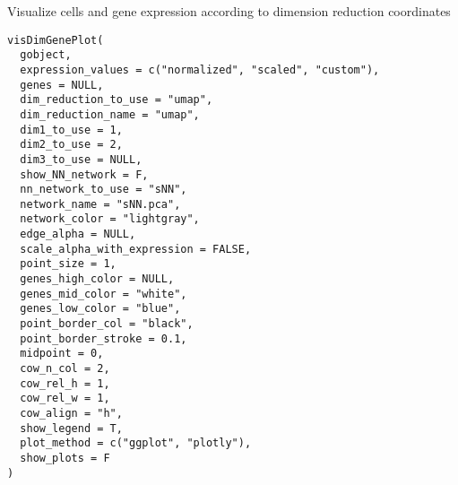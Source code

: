 \documentclass[a4paper]{book}
\begin{document}
%
\begin{Description}\relax
Visualize cells and gene expression according to dimension reduction coordinates
\end{Description}
%
\begin{Usage}
\begin{verbatim}
visDimGenePlot(
  gobject,
  expression_values = c("normalized", "scaled", "custom"),
  genes = NULL,
  dim_reduction_to_use = "umap",
  dim_reduction_name = "umap",
  dim1_to_use = 1,
  dim2_to_use = 2,
  dim3_to_use = NULL,
  show_NN_network = F,
  nn_network_to_use = "sNN",
  network_name = "sNN.pca",
  network_color = "lightgray",
  edge_alpha = NULL,
  scale_alpha_with_expression = FALSE,
  point_size = 1,
  genes_high_color = NULL,
  genes_mid_color = "white",
  genes_low_color = "blue",
  point_border_col = "black",
  point_border_stroke = 0.1,
  midpoint = 0,
  cow_n_col = 2,
  cow_rel_h = 1,
  cow_rel_w = 1,
  cow_align = "h",
  show_legend = T,
  plot_method = c("ggplot", "plotly"),
  show_plots = F
)
\end{verbatim}
\end{Usage}
%
\end{document}

